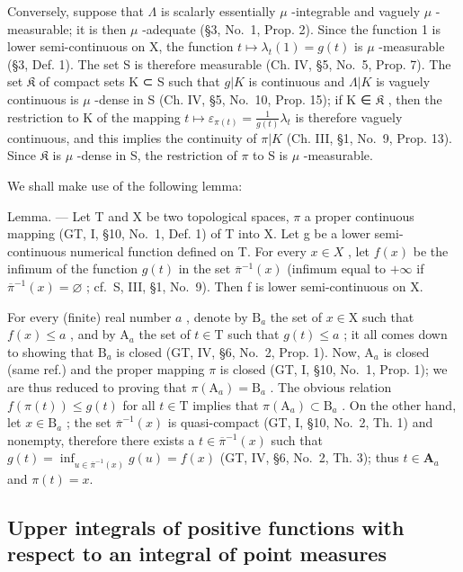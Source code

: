 Conversely, suppose that \(\Lambda\) is scalarly essentially \(\mu\) -integrable and vaguely \(\mu\) -measurable; it is then \(\mu\) -adequate (§3, No.~1, Prop. 2). Since the function 1 is lower semi-continuous on X, the function \(t \mapsto \lambda_t(1) = g(t)\) is \(\mu\) -measurable (§3, Def. 1). The set S is therefore measurable (Ch. IV, §5, No.~5, Prop. 7). The set \(\mathfrak{K}\) of compact sets K ⊂ S such that \(g|K\) is continuous and \(\Lambda|K\) is vaguely continuous is \(\mu\) -dense in S (Ch. IV, §5, No.~10, Prop. 15); if K ∈ \(\mathfrak{K}\) , then the restriction to K of the mapping \(t \mapsto \varepsilon_{\pi(t)} = \frac{1}{g(t)} \lambda_t\) is therefore vaguely continuous, and this implies the continuity of \(\pi|K\) (Ch. III, §1, No.~9, Prop. 13). Since \(\mathfrak{K}\) is \(\mu\) -dense in S, the restriction of \(\pi\) to S is \(\mu\) -measurable.

We shall make use of the following lemma:

Lemma. --- Let T and X be two topological spaces, \(\pi\) a proper continuous mapping (GT, I, §10, No.~1, Def. 1) of T into X. Let g be a lower semi-continuous numerical function defined on T. For every \(x \in X\) , let \(f(x)\) be the infimum of the function \(g(t)\) in the set \(\overline{\pi}^{-1}(x)\) (infimum equal to \(+\infty\) if \(\overline{\pi}^{-1}(x) = \varnothing\) ; cf.~S, III, §1, No.~9). Then f is lower semi-continuous on X.

For every (finite) real number \(a\) , denote by \(\mathrm{B}_a\) the set of \(x \in \mathrm{X}\) such that \(f(x) \leqslant a\) , and by \(\mathrm{A}_a\) the set of \(t \in \mathrm{T}\) such that \(g(t) \leqslant a\) ; it all comes down to showing that \(\mathrm{B}_a\) is closed (GT, IV, §6, No.~2, Prop. 1). Now, \(\mathrm{A}_a\) is closed (same ref.) and the proper mapping \(\pi\) is closed (GT, I, §10, No.~1, Prop. 1); we are thus reduced to proving that \(\pi(\mathrm{A}_a) = \mathrm{B}_a\) . The obvious relation \(f(\pi(t)) \leqslant g(t)\) for all \(t \in \mathrm{T}\) implies that \(\pi(\mathrm{A}_a) \subset \mathrm{B}_a\) . On the other hand, let \(x \in \mathrm{B}_a\) ; the set \(\overline{\pi}^{-1}(x)\) is quasi-compact (GT, I, §10, No.~2, Th. 1) and nonempty, therefore there exists a \(t \in \overline{\pi}^{-1}(x)\) such that \(g(t) = \inf_{u\in \overline{\pi}^{-1} (x)}g(u) = f(x)\) (GT, IV, §6, No.~2, Th. 3); thus \(t\in \mathbf{A}_a\) and \(\pi (t) = x\).

\subsection{Upper integrals of positive functions with respect to an integral of point measures}

